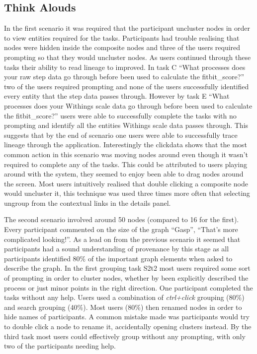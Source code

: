\subsection{Think Alouds}
\label{sub:think_alouds}

In the first scenario it was required that the participant uncluster nodes in order to view entities required for the tasks. Participants had trouble realising that nodes were hidden inside the composite nodes and three of the users required prompting so that they would uncluster nodes. As users continued through these tasks their ability to read lineage to improved. In task C ``What processes does your raw step data go through before been used to calculate the fitbit\_score?'' two of the users required prompting and none of the users successfully identified every entity that the step data passes through. However by task E ``What processes does your Withings scale data go through before been used to calculate the fitbit\_score?'' users were able to successfully complete the tasks with no prompting and identify all the entities Withings scale data passes through. This suggests that by the end of scenario one users were able to successfully trace lineage through the application. Interestingly the clickdata shows that the most common action in this scenario was moving nodes around even though it wasn't required to complete any of the tasks. This could be attributed to users playing around with the system, they seemed to enjoy been able to drag nodes around the screen. Most users intuitively realised that double clicking a composite node would uncluster it, this technique was used three times more often that selecting ungroup from the contextual links in the details panel.

The second scenario involved around 50 nodes (compared to 16 for the first). Every participant commented on the size of the graph ``Gasp'', ``That's more complicated looking!''. As a lead on from the previous scenario it seemed that participants had a sound understanding of provenance by this stage as all participants identified 80\% of the important graph elements when asked to describe the graph. In the first grouping task S2t2 most users required some sort of prompting in order to cluster nodes, whether by been explicitly described the process or just minor points in the right direction. One participant completed the tasks without any help. Users used a combination of \textit{ctrl+click} grouping (80\%) and search grouping (40\%). Most users (80\%) then renamed nodes in order to hide names of participants. A common mistake made was participants would try to double click a node to rename it, accidentally opening clusters instead. By the third task most users could effectively group without any prompting, with only two of the participants needing help.

